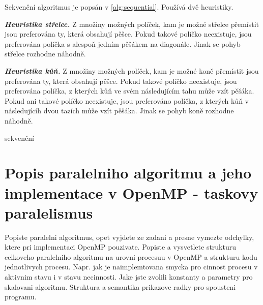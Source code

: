 \documentclass{article}
\newcommand{\heuristika}[1]{\textbf{\textit{Heuristika {#1}.}}}
\begin{document}
    Sekvenční algoritmus je popsán v \ref{alg:sequential}. Používá dvě heuristiky.

    \heuristika{střelec} Z množiny možných políček, kam je možné střelce přemístit jsou preferována ty,
    která obsahují pěšce. Pokud takové políčko neexistuje, jsou preferována políčka s alespoň jedním pěšákem
    na diagonále. Jinak se pohyb střelce rozhodne náhodně.
    \hspace{1pt}


    \heuristika{kůň} Z množiny možných políček, kam je možné koně přemístit jsou preferována ty,
    která obsahují pěšce. Pokud takové políčko neexistuje, jsou preferována políčka, z kterých
    kůň ve svém následujícím tahu může vzít pěšáka. Pokud ani takové políčko neexistuje, jsou
    preferováno políčka, z kterých kůň v následujícíh dvou tazích může vzít pěšáka.
    Jinak se pohyb koně rozhodne náhodně.

    \begin{algorithm}[H]
        \SetAlgoLined

        \BlankLine

        \;
        \caption{sekvenční}
        \label{alg:sequential}
    \end{algorithm}

    \section{Popis paralelniho algoritmu a jeho implementace v OpenMP - taskovy paralelismus}

    Popiste paralelni algoritmus, opet vyjdete ze zadani a presne vymezte
    odchylky, ktere pri implementaci OpenMP pouzivate.
    Popiste a vysvetlete strukturu celkoveho
    paralelniho algoritmu na urovni procesuu v OpenMP a strukturu kodu
    jednotlivych procesu. Napr. jak je naimplemtovana smycka pro cinnost
    procesu v aktivnim stavu i v stavu necinnosti. Jake jste zvolili
    konstanty a parametry pro skalovani algoritmu. Struktura a semantika
    prikazove radky pro spousteni programu.
\end{document}
